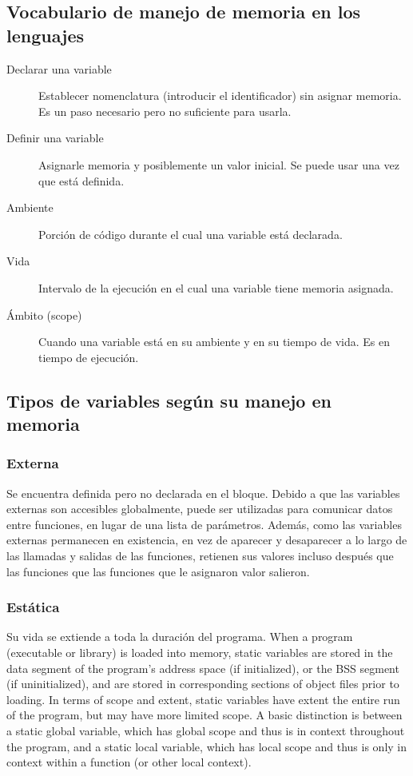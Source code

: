 \documentclass[a4paper, twoside]{article}
\begin{document}
\subsection{Vocabulario de manejo de memoria en los lenguajes}
\begin{description}
  \item[Declarar una variable] Establecer nomenclatura (introducir el
  identificador) sin asignar memoria.
  Es un paso necesario pero no suficiente para usarla.

  \item[Definir una variable] Asignarle memoria y posiblemente un valor inicial.
  Se puede usar una vez que está definida.

  \item[Ambiente] Porción de código durante el cual una variable está declarada.

  \item[Vida] Intervalo de la ejecución en el cual una variable tiene
  memoria asignada.

  \item[Ámbito (scope)] Cuando una variable está en su ambiente y
  en su tiempo de vida. Es en tiempo de ejecución.
\end{description}

\subsection{Tipos de variables según su manejo en memoria}

\subsubsection{Externa}

Se encuentra definida pero no declarada en el bloque.
Debido a que las variables externas son accesibles globalmente,
puede ser utilizadas para comunicar datos entre funciones,
en lugar de una lista de parámetros.
Además, como las variables externas permanecen en existencia, en vez de
aparecer y desaparecer a lo largo de las llamadas y salidas de las funciones,
retienen sus valores incluso después que las funciones que las funciones que
le asignaron valor salieron.

\subsubsection{Estática}

Su vida se extiende a toda la duración del programa.
When a program (executable or library) is loaded into memory, static variables
are stored in the data segment of the program's address space (if initialized),
or the BSS segment (if uninitialized), and are stored in corresponding sections
of object files prior to loading.
In terms of scope and extent, static variables have extent the entire run of
the program, but may have more limited scope.
A basic distinction is between a static global variable, which has global scope
and thus is in context throughout the program, and a static local variable,
which has local scope and thus is only in context within a function (or other
local context).
\end{document}
